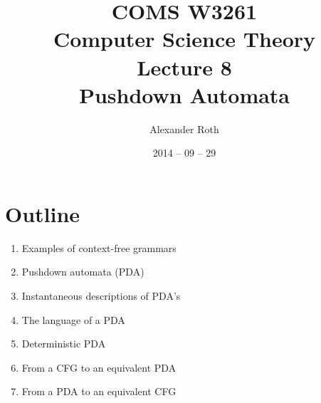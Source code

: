 \documentclass[]{article}
\begin{document}
\newcommand*{\xml}[1]{\texttt{<#1>}}

\title{COMS W3261 \\ Computer Science Theory \\ Lecture 8\\ Pushdown Automata}
\author{Alexander Roth}
\date{2014 -- 09 -- 29}
\maketitle

\section*{Outline}
  \begin{enumerate}
    \item Examples of context-free grammars
    \item Pushdown automata (PDA)
    \item Instantaneous descriptions of PDA's
    \item The language of a PDA
    \item Deterministic PDA
    \item From a CFG to an equivalent PDA
    \item From a PDA to an equivalent CFG
  \end{enumerate}
  
\end{document}
